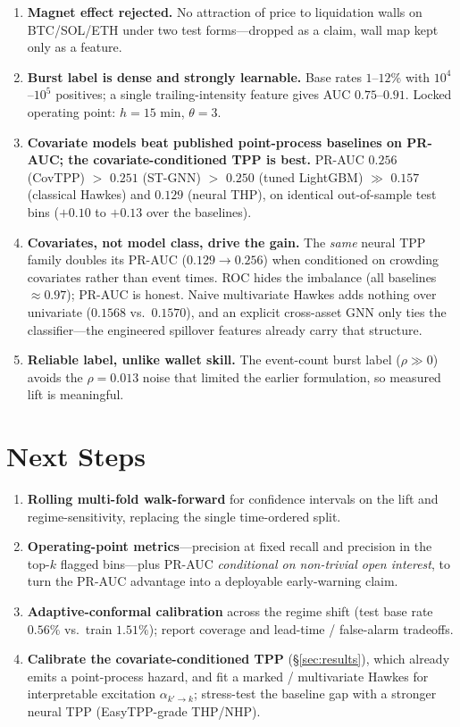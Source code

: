 \documentclass[11pt,a4paper]{article}
\begin{document}
\begin{enumerate}[label=\textbf{F\arabic*:}]
    \item \textbf{Magnet effect rejected.} No attraction of price to liquidation walls on BTC/SOL/ETH under two test forms---dropped as a claim, wall map kept only as a feature.
    \item \textbf{Burst label is dense and strongly learnable.} Base rates $1$--$12\%$ with $10^4$--$10^5$ positives; a single trailing-intensity feature gives AUC $0.75$--$0.91$. Locked operating point: $h=15$ min, $\theta=3$.
    \item \textbf{Covariate models beat published point-process baselines on PR-AUC; the covariate-conditioned TPP is best.} PR-AUC $0.256$ (CovTPP) $>$ $0.251$ (ST-GNN) $>$ $0.250$ (tuned LightGBM) $\gg$ $0.157$ (classical Hawkes) and $0.129$ (neural THP), on identical out-of-sample test bins ($+0.10$ to $+0.13$ over the baselines).
    \item \textbf{Covariates, not model class, drive the gain.} The \emph{same} neural TPP family doubles its PR-AUC ($0.129\to0.256$) when conditioned on crowding covariates rather than event times. ROC hides the imbalance (all baselines $\approx 0.97$); PR-AUC is honest. Naive multivariate Hawkes adds nothing over univariate ($0.1568$ vs.\ $0.1570$), and an explicit cross-asset GNN only ties the classifier---the engineered spillover features already carry that structure.
    \item \textbf{Reliable label, unlike wallet skill.} The event-count burst label ($\rho \gg 0$) avoids the $\rho=0.013$ noise that limited the earlier formulation, so measured lift is meaningful.
\end{enumerate}

\section{Next Steps}

\begin{enumerate}[label=\textbf{NS\arabic*:}]
    \item \textbf{Rolling multi-fold walk-forward} for confidence intervals on the lift and regime-sensitivity, replacing the single time-ordered split.
    \item \textbf{Operating-point metrics}---precision at fixed recall and precision in the top-$k$ flagged bins---plus PR-AUC \emph{conditional on non-trivial open interest}, to turn the PR-AUC advantage into a deployable early-warning claim.
    \item \textbf{Adaptive-conformal calibration} across the regime shift (test base rate $0.56\%$ vs.\ train $1.51\%$); report coverage and lead-time / false-alarm tradeoffs.
    \item \textbf{Calibrate the covariate-conditioned TPP} (\S\ref{sec:results}), which already emits a point-process hazard, and fit a marked / multivariate Hawkes for interpretable excitation $\alpha_{k'\to k}$; stress-test the baseline gap with a stronger neural TPP (EasyTPP-grade THP/NHP).
\end{enumerate}
\end{document}
